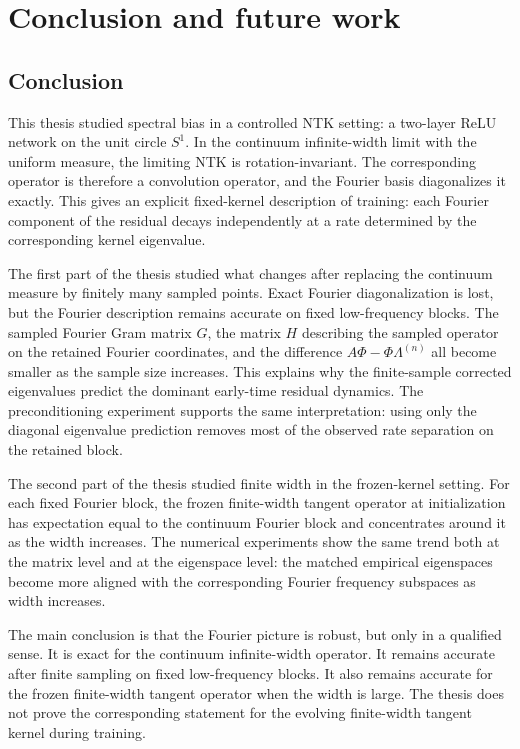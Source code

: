 \chapter{\label{cha:conclusion}Conclusion and future work}

\section{Conclusion}
\label{sec:conclusion}

This thesis studied spectral bias in a controlled NTK setting: a two-layer ReLU
network on the unit circle \(S^1\). In the continuum infinite-width limit with
the uniform measure, the limiting NTK is rotation-invariant. The corresponding
operator is therefore a convolution operator, and the Fourier basis diagonalizes
it exactly. This gives an explicit fixed-kernel description of training: each
Fourier component of the residual decays independently at a rate determined by
the corresponding kernel eigenvalue.

The first part of the thesis studied what changes after replacing the continuum
measure by finitely many sampled points. Exact Fourier diagonalization is lost,
but the Fourier description remains accurate on fixed low-frequency blocks. The
sampled Fourier Gram matrix \(G\), the matrix \(H\) describing the sampled
operator on the retained Fourier coordinates, and the difference
\(A\Phi-\Phi\Lambda^{(n)}\) all become smaller as the sample size increases.
This explains why the finite-sample corrected eigenvalues predict the dominant
early-time residual dynamics. The preconditioning experiment supports the same
interpretation: using only the diagonal eigenvalue prediction removes most of
the observed rate separation on the retained block.

The second part of the thesis studied finite width in the frozen-kernel setting.
For each fixed Fourier block, the frozen finite-width tangent operator at
initialization has expectation equal to the continuum Fourier block and
concentrates around it as the width increases. The numerical experiments show
the same trend both at the matrix level and at the eigenspace level: the matched
empirical eigenspaces become more aligned with the corresponding Fourier
frequency subspaces as width increases.

The main conclusion is that the Fourier picture is robust, but only in a
qualified sense. It is exact for the continuum infinite-width operator. It
remains accurate after finite sampling on fixed low-frequency blocks. It also
remains accurate for the frozen finite-width tangent operator when the width is
large. The thesis does not prove the corresponding statement for the evolving
finite-width tangent kernel during training.

